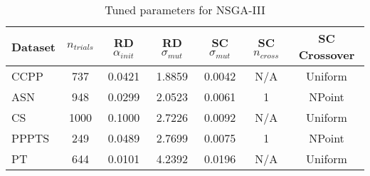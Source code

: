 \begin{table}[ht]
\centering
\caption{Tuned parameters for NSGA-III}
\begin{tabular}{lcccccc}
\hline
Dataset & $n_{trials}$ & \acs{RD} $\alpha_{init}$ & \acs{RD} $\sigma_{mut}$ & \acs{SC} $\sigma_{mut}$ & \acs{SC} $n_{cross}$ & \acs{SC} Crossover \\
\hline
CCPP & 737 & 0.0421 & 1.8859 & 0.0042 & N/A & Uniform \\
ASN & 948 & 0.0299 & 2.0523 & 0.0061 & 1 & NPoint \\
CS & 1000 & 0.1000 & 2.7226 & 0.0092 & N/A & Uniform \\
PPPTS & 249 & 0.0489 & 2.7699 & 0.0075 & 1 & NPoint \\
PT & 644 & 0.0101 & 4.2392 & 0.0196 & N/A & Uniform \\
\hline
\end{tabular}
\end{table}